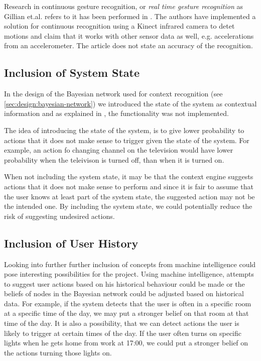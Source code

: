 Research in continuous gesture recognition, or \emph{real time gesture recognition} as Gillian et.al. refers to it has been performed in \cite{gillian2014gesture}. The authors have implemented a solution for continuous recognition using a Kinect infrared camera to detet motions and claim that it works with other sensor data as well, e.g. accelerations from an accelerometer. The article does not state an accuracy of the recognition.

\subsection{Inclusion of System State}

In the design of the Bayesian network used for context recognition (see \ref{sec:design:bayesian-network}) we introduced the state of the system as contextual information and as explained in , the functionality was not implemented.

The idea of introducing the state of the system, is to give lower probability to actions that it does not make sense to trigger given the state of the system. For example, an action fo changing channel on the television would have lower probability when the teleivison is turned off, than when it is turned on. 

When not including the system state, it may be that the context engine suggests actions that it does not make sense to perform and since it is fair to assume that the user knows at least part of the system state, the suggested action may not be the intended one. By including the system state, we could potentially reduce the risk of suggesting undesired actions.

\subsection{Inclusion of User History}

Looking into further further inclusion of concepts from machine intelligence could pose interesting possibilities for the project. Using machine intelligence, attempts to suggest user actions based on his historical behaviour could be made or the beliefs of nodes in the Bayesian network could be adjusted based on historical data. For example, if the system detects that the user is often in a specific room at a specific time of the day, we may put a stronger belief on that room at that time of the day. It is also a possibility, that we can detect actions the user is likely to trigger at certain times of the day. If the user often turns on specific lights when he gets home from work at 17:00, we could put a stronger belief on the actions turning those lights on.

